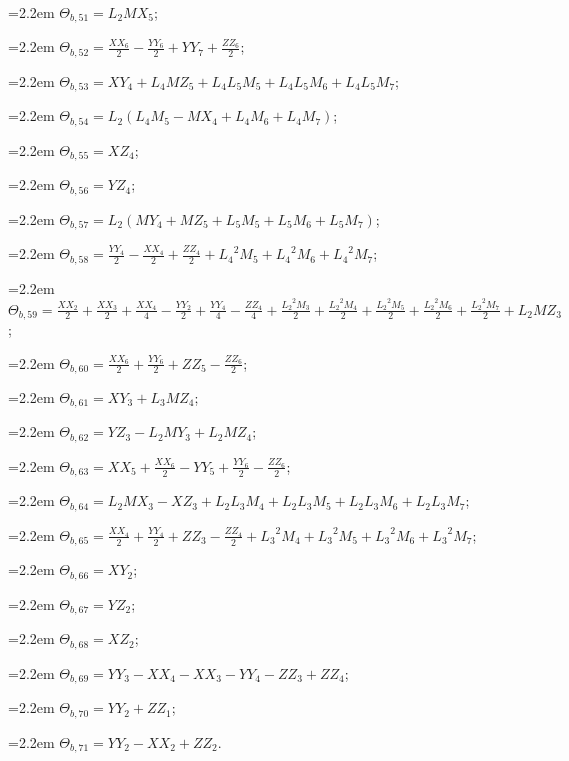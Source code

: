 {\hangindent=2.2em $\Theta_{b,51}=L_{2}MX_{5}$;\par
\hangindent=2.2em $\Theta_{b,52}=\tfrac{XX_{6}}{2}-\tfrac{YY_{6}}{2}+YY_{7}+\tfrac{ZZ_{6}}{2}$;\par
\hangindent=2.2em $\Theta_{b,53}=XY_{4}+L_{4}MZ_{5}+L_{4}L_{5}M_{5}+L_{4}L_{5}M_{6}+L_{4}L_{5}M_{7}$;\par
\hangindent=2.2em $\Theta_{b,54}=L_{2}(L_{4}M_{5}-MX_{4}+L_{4}M_{6}+L_{4}M_{7})$;\par
\hangindent=2.2em $\Theta_{b,55}=XZ_{4}$;\par
\hangindent=2.2em $\Theta_{b,56}=YZ_{4}$;\par
\hangindent=2.2em $\Theta_{b,57}=L_{2}(MY_{4}+MZ_{5}+L_{5}M_{5}+L_{5}M_{6}+L_{5}M_{7})$;\par
\hangindent=2.2em $\Theta_{b,58}=\tfrac{YY_{4}}{2}-\tfrac{XX_{4}}{2}+\tfrac{ZZ_{4}}{2}+{L_{4}}^2M_{5}+{L_{4}}^2M_{6}+{L_{4}}^2M_{7}$;\par
\hangindent=2.2em $\Theta_{b,59}=\tfrac{XX_{2}}{2}+\tfrac{XX_{3}}{2}+\tfrac{XX_{4}}{4}-\tfrac{YY_{2}}{2}+\tfrac{YY_{4}}{4}-\tfrac{ZZ_{4}}{4}+\tfrac{{L_{2}}^2M_{3}}{2}+\tfrac{{L_{2}}^2M_{4}}{2}+\tfrac{{L_{2}}^2M_{5}}{2}+\tfrac{{L_{2}}^2M_{6}}{2}+\tfrac{{L_{2}}^2M_{7}}{2}+L_{2}MZ_{3}$;\par
\hangindent=2.2em $\Theta_{b,60}=\tfrac{XX_{6}}{2}+\tfrac{YY_{6}}{2}+ZZ_{5}-\tfrac{ZZ_{6}}{2}$;\par
\hangindent=2.2em $\Theta_{b,61}=XY_{3}+L_{3}MZ_{4}$;\par
\hangindent=2.2em $\Theta_{b,62}=YZ_{3}-L_{2}MY_{3}+L_{2}MZ_{4}$;\par
\hangindent=2.2em $\Theta_{b,63}=XX_{5}+\tfrac{XX_{6}}{2}-YY_{5}+\tfrac{YY_{6}}{2}-\tfrac{ZZ_{6}}{2}$;\par
\hangindent=2.2em $\Theta_{b,64}=L_{2}MX_{3}-XZ_{3}+L_{2}L_{3}M_{4}+L_{2}L_{3}M_{5}+L_{2}L_{3}M_{6}+L_{2}L_{3}M_{7}$;\par
\hangindent=2.2em $\Theta_{b,65}=\tfrac{XX_{4}}{2}+\tfrac{YY_{4}}{2}+ZZ_{3}-\tfrac{ZZ_{4}}{2}+{L_{3}}^2M_{4}+{L_{3}}^2M_{5}+{L_{3}}^2M_{6}+{L_{3}}^2M_{7}$;\par
\hangindent=2.2em $\Theta_{b,66}=XY_{2}$;\par
\hangindent=2.2em $\Theta_{b,67}=YZ_{2}$;\par
\hangindent=2.2em $\Theta_{b,68}=XZ_{2}$;\par
\hangindent=2.2em $\Theta_{b,69}=YY_{3}-XX_{4}-XX_{3}-YY_{4}-ZZ_{3}+ZZ_{4}$;\par
\hangindent=2.2em $\Theta_{b,70}=YY_{2}+ZZ_{1}$;\par
\hangindent=2.2em $\Theta_{b,71}=YY_{2}-XX_{2}+ZZ_{2}$.\par
}
